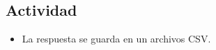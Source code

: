 \subsection{Actividad }\label{appx:a1}

\begin{frame}\justifying


\vspace{10pt}


\begin{itemize}
\item La respuesta se guarda en un archivos \acrshort{CSV}.

\end{itemize}

\end{frame}

